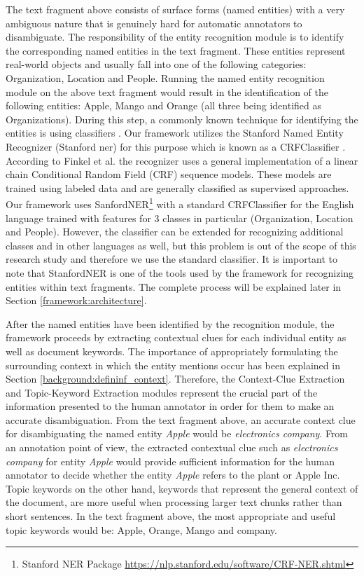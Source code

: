 The text fragment above consists of surface forms (named entities) with a very ambiguous nature that is genuinely hard for automatic annotators to disambiguate. The responsibility of the entity recognition module is to identify the corresponding named entities in the text fragment. These entities represent real-world objects and usually fall into one of the following categories: Organization, Location and People. Running the named entity recognition module on the above text fragment would result in the identification of the following entities: Apple, Mango and Orange (all three being identified as Organizations). During this step, a commonly known technique for identifying the entities is using classifiers \cite{13}. Our framework utilizes the Stanford Named Entity Recognizer (Stanford \ac{ner}) for this purpose which is known as a CRFClassifier \cite{standfordNER}. According to Finkel et al. \cite{standfordNER} the recognizer uses a general implementation of a linear chain Conditional Random Field (CRF) sequence models. These models are trained using labeled data and are generally classified as supervised approaches. Our framework uses SanfordNER\footnote{Stanford NER Package \url{https://nlp.stanford.edu/software/CRF-NER.shtml}} with a standard CRFClassifier for the English language trained with features for 3 classes in particular (Organization, Location and People). However, the classifier can be extended for recognizing additional classes and in other languages as well, but this problem is out of the scope of this research study and therefore we use the standard classifier. It is important to note that StanfordNER is one of the tools used by the framework for recognizing entities within text fragments. The complete process will be explained later in Section \ref{framework:architecture}. 

After the named entities have been identified by the recognition module, the framework proceeds by extracting contextual clues for each individual entity as well as document keywords. The importance of appropriately formulating the surrounding context in which the entity mentions occur has been explained in Section \ref{background:defininf_context}. Therefore, the Context-Clue Extraction and Topic-Keyword Extraction modules represent the crucial part of the information presented to the human annotator in order for them to make an accurate disambiguation. From the text fragment above, an accurate context clue for disambiguating the named entity \textit{Apple} would be \textit{electronics company}. From an annotation point of view, the extracted contextual clue such as \textit{electronics company} for entity \textit{Apple} would provide sufficient information for the human annotator to decide whether the entity \textit{Apple} refers to the plant or Apple Inc. Topic keywords on the other hand, keywords that represent the general context of the document, are more useful when processing larger text chunks rather than short sentences. In the text fragment above, the most appropriate and useful topic keywords would be: Apple, Orange, Mango and company. 

